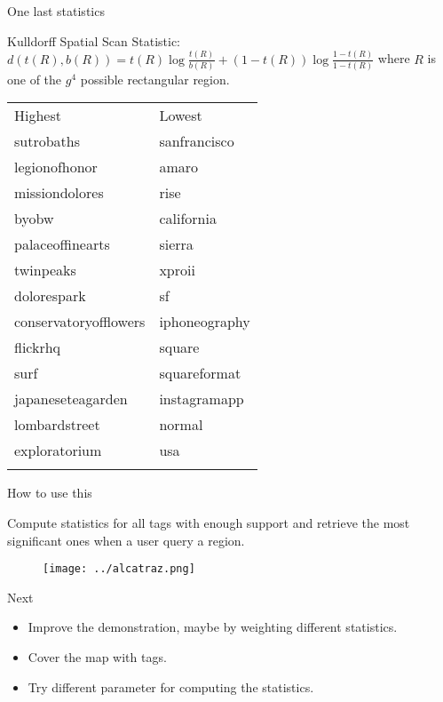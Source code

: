 \begin{frame}{One last statistics}

Kulldorff Spatial Scan Statistic:
$d(t(R), b(R)) = t(R)\log \frac{t(R)}{b(R)} + (1-t(R))\log \frac{1-t(R)}{1-t(R)}$
where $R$ is one of the $g^4$ possible rectangular region.

\begin{scriptsize}
\begin{longtable}[c]{@{}ll@{}}
\hline\noalign{\medskip}
Highest & Lowest
\\\noalign{\medskip}
\hline\noalign{\medskip}
sutrobaths & sanfrancisco
\\\noalign{\medskip}
legionofhonor & amaro
\\\noalign{\medskip}
missiondolores & rise
\\\noalign{\medskip}
byobw & california
\\\noalign{\medskip}
palaceoffinearts & sierra
\\\noalign{\medskip}
twinpeaks & xproii
\\\noalign{\medskip}
dolorespark & sf
\\\noalign{\medskip}
conservatoryofflowers & iphoneography
\\\noalign{\medskip}
flickrhq & square
\\\noalign{\medskip}
surf & squareformat
\\\noalign{\medskip}
japaneseteagarden & instagramapp
\\\noalign{\medskip}
lombardstreet & normal
\\\noalign{\medskip}
exploratorium & usa
\\\noalign{\medskip}
\hline
\end{longtable}
\end{scriptsize}

\end{frame}

\begin{frame}{How to use this}

Compute statistics for all tags with enough support and retrieve the
most significant ones when a user query a region.

\begin{figure} \texttt{[image: ../alcatraz.png]}
\end{figure}

\end{frame}

\begin{frame}{Next}

\begin{itemize}
\item
  Improve the demonstration, maybe by weighting different statistics.
\item
  Cover the map with tags.
\item
  Try different parameter for computing the statistics.
\end{itemize}

\end{frame}
